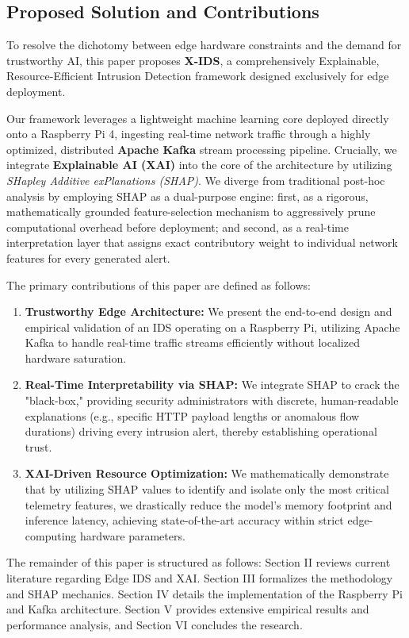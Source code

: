 \subsection{Proposed Solution and Contributions}
To resolve the dichotomy between edge hardware constraints and the demand for trustworthy AI, this paper proposes \textbf{X-IDS}, a comprehensively Explainable, Resource-Efficient Intrusion Detection framework designed exclusively for edge deployment. 

Our framework leverages a lightweight machine learning core deployed directly onto a Raspberry Pi 4, ingesting real-time network traffic through a highly optimized, distributed \textbf{Apache Kafka} stream processing pipeline. Crucially, we integrate \textbf{Explainable AI (XAI)} into the core of the architecture by utilizing \textit{SHapley Additive exPlanations (SHAP)}. We diverge from traditional post-hoc analysis by employing SHAP as a dual-purpose engine: first, as a rigorous, mathematically grounded feature-selection mechanism to aggressively prune computational overhead before deployment; and second, as a real-time interpretation layer that assigns exact contributory weight to individual network features for every generated alert.

The primary contributions of this paper are defined as follows:
\begin{enumerate}
    \item \textbf{Trustworthy Edge Architecture:} We present the end-to-end design and empirical validation of an IDS operating on a Raspberry Pi, utilizing Apache Kafka to handle real-time traffic streams efficiently without localized hardware saturation.
    \item \textbf{Real-Time Interpretability via SHAP:} We integrate SHAP to crack the "black-box," providing security administrators with discrete, human-readable explanations (e.g., specific HTTP payload lengths or anomalous flow durations) driving every intrusion alert, thereby establishing operational trust.
    \item \textbf{XAI-Driven Resource Optimization:} We mathematically demonstrate that by utilizing SHAP values to identify and isolate only the most critical telemetry features, we drastically reduce the model's memory footprint and inference latency, achieving state-of-the-art accuracy within strict edge-computing hardware parameters.
\end{enumerate}

The remainder of this paper is structured as follows: Section II reviews current literature regarding Edge IDS and XAI. Section III formalizes the methodology and SHAP mechanics. Section IV details the implementation of the Raspberry Pi and Kafka architecture. Section V provides extensive empirical results and performance analysis, and Section VI concludes the research.
